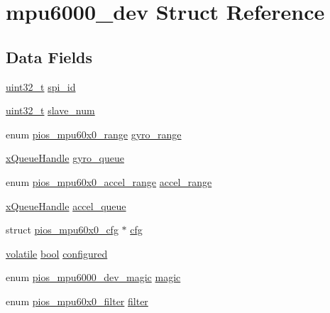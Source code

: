 \hypertarget{structmpu6000__dev}{\section{mpu6000\-\_\-dev Struct Reference}
\label{structmpu6000__dev}
}
\subsection*{Data Fields}
\begin{DoxyCompactItemize}
\item 
\hyperlink{stdint_8h_a435d1572bf3f880d55459d9805097f62}{uint32\-\_\-t} \hyperlink{structmpu6000__dev_a7409608d24410d4ef980f9c05085bdb5}{spi\-\_\-id}
\item 
\hyperlink{stdint_8h_a435d1572bf3f880d55459d9805097f62}{uint32\-\_\-t} \hyperlink{structmpu6000__dev_a2b1869dd86c392ccfe9a0cd881a3b4a7}{slave\-\_\-num}
\item 
enum \hyperlink{group___p_i_o_s___m_p_u60_x0_ga56700b0154a14cf67c9f8f44a86ad9c0}{pios\-\_\-mpu60x0\-\_\-range} \hyperlink{structmpu6000__dev_a0d330b8cdca1d01d4b5eecd21bba78f6}{gyro\-\_\-range}
\item 
\hyperlink{_common_2_libraries_2_free_r_t_o_s_2_source_2include_2queue_8h_a229037f755b756156e34a440ce134b8b}{x\-Queue\-Handle} \hyperlink{structmpu6000__dev_a356a86d4ad42dd2daecb5e255cc5f7ce}{gyro\-\_\-queue}
\item 
enum \hyperlink{group___p_i_o_s___m_p_u60_x0_ga8f297bddae3eb43bbf7b54abc6494992}{pios\-\_\-mpu60x0\-\_\-accel\-\_\-range} \hyperlink{structmpu6000__dev_a97c53e87c85ad8b04916492833bedadb}{accel\-\_\-range}
\item 
\hyperlink{_common_2_libraries_2_free_r_t_o_s_2_source_2include_2queue_8h_a229037f755b756156e34a440ce134b8b}{x\-Queue\-Handle} \hyperlink{structmpu6000__dev_aab5a85c354860f95eabe5fdaac73504a}{accel\-\_\-queue}
\item 
struct \hyperlink{structpios__mpu60x0__cfg}{pios\-\_\-mpu60x0\-\_\-cfg} $\ast$ \hyperlink{structmpu6000__dev_a4a8e8aa9b09f9ce6dcb417ff154282bc}{cfg}
\item 
\hyperlink{group___c_m_s_i_s___core___instruction_interface_gad7d93af13046b0378601b85c8c16673b}{volatile} \hyperlink{group___exported__types_gaf6a258d8f3ee5206d682d799316314b1}{bool} \hyperlink{structmpu6000__dev_a235cf7e1cc85cf6707100027c483894a}{configured}
\item 
enum \hyperlink{group___p_i_o_s___m_p_u6000_gacec1373b8d76d996eacbadde2698c1ee}{pios\-\_\-mpu6000\-\_\-dev\-\_\-magic} \hyperlink{structmpu6000__dev_a11582fec1335a7b8e45979545ce7191b}{magic}
\item 
enum \hyperlink{group___p_i_o_s___m_p_u60_x0_gacce1988bc994f5ade6ac748c2bf0b924}{pios\-\_\-mpu60x0\-\_\-filter} \hyperlink{structmpu6000__dev_ad8507301bf86feb8f18211ddb353f332}{filter}
\end{DoxyCompactItemize}


